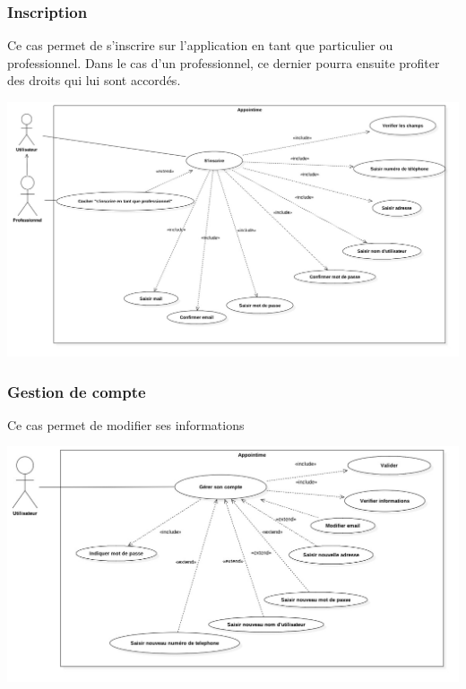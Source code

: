 \documentclass{article}
\begin{document}
\subsubsection{Inscription}
Ce cas permet de s'inscrire sur l'application en tant que particulier ou professionnel.
Dans le cas d'un professionnel, ce dernier pourra ensuite profiter des droits qui lui sont accordés.

\begin{center}
  \includegraphics[width=400pt]{diagram/useCaseInsc}
\end{center}


\subsubsection{Gestion de compte}
Ce cas permet de modifier ses informations
\begin{center}
  \includegraphics[width=400pt]{diagram/useCaseGererCompte}
\end{center}
\end{document}
